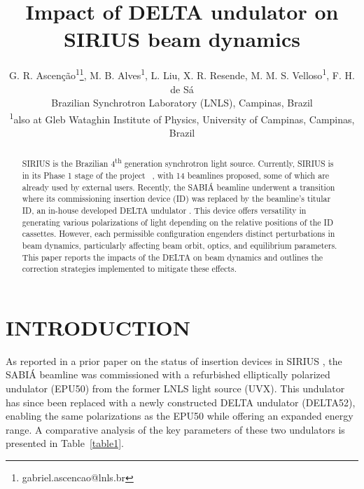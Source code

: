 \documentclass[a4paper,
               keeplastbox,   %
               ]{jacow}
\begin{document}
\title{Impact of DELTA undulator on SIRIUS beam dynamics }

\author{G. R. Ascenção\textsuperscript{1}\thanks{gabriel.ascencao@lnls.br}, M. B. Alves\textsuperscript{1}, L. Liu, X. R. Resende, M. M. S. Velloso\textsuperscript{1}, F. H. de Sá\\ Brazilian Synchrotron Laboratory (LNLS), Campinas, Brazil \\
\textsuperscript{1}also at Gleb Wataghin Institute of Physics, University of Campinas, Campinas, Brazil
}

	
\maketitle
%
\begin{abstract}
SIRIUS is the Brazilian 4\textsuperscript{th} generation synchrotron light source. Currently, SIRIUS is in its Phase 1 stage of the project ~\cite{Liu:IPAC23-WEOGA2, Beamlines}, with 14 beamlines proposed, some of which are already used by external users. Recently, the SABIÁ beamline underwent a transition where its commissioning insertion device (ID) was replaced by the beamline's titular ID, an in-house developed DELTA undulator  \cite{Vilela:IPAC17-WEPIK053, Vilela:IPAC18-TUPMK003}. This device offers versatility in generating various polarizations of light depending on the relative positions of the ID cassettes. However,  each permissible configuration engenders distinct perturbations in beam dynamics, particularly affecting beam orbit, optics, and equilibrium parameters. This paper reports the impacts of the DELTA on beam dynamics and outlines the correction strategies implemented to mitigate these effects.
\end{abstract}


\section{INTRODUCTION}

As reported in a prior paper on the status of insertion devices in SIRIUS \cite{Ascenção:IPAC23-MOPM088}, the SABIÁ beamline was commissioned with a refurbished elliptically polarized undulator (EPU50) from the former LNLS light source (UVX). This undulator has since been replaced with a newly constructed DELTA undulator (DELTA52), enabling the same polarizations as the EPU50 while offering an expanded energy range. A comparative analysis of the key parameters of these two undulators is presented in Table~\ref{table1}.
\end{document}

